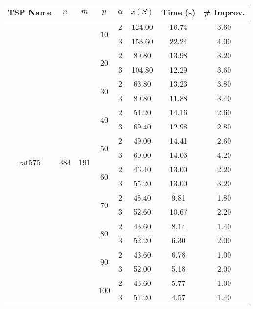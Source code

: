 \begin{tabular}{|ccccc|ccc|}
\toprule
       TSP Name & $n$ & $m$ & $p$ & $\alpha$   & $x(S)$ &  Time (s) &  \# Improv. \\
\midrule
\multirow{20}{*}{rat575} & \multirow{20}{*}{384} & \multirow{20}{*}{191} & \multirow{2}{*}{10} & 2 & 124.00 & 16.74 &     3.60 \\
       &     &     &     & 3 & 153.60 & 22.24 &     4.00 \\
\cline{4-8}
       &     &     & \multirow{2}{*}{20} & 2 &  80.80 & 13.98 &     3.20 \\
       &     &     &     & 3 & 104.80 & 12.29 &     3.60 \\
\cline{4-8}
       &     &     & \multirow{2}{*}{30} & 2 &  63.80 & 13.23 &     3.80 \\
       &     &     &     & 3 &  80.80 & 11.88 &     3.40 \\
\cline{4-8}
       &     &     & \multirow{2}{*}{40} & 2 &  54.20 & 14.16 &     2.60 \\
       &     &     &     & 3 &  69.40 & 12.98 &     2.80 \\
\cline{4-8}
       &     &     & \multirow{2}{*}{50} & 2 &  49.00 & 14.41 &     2.60 \\
       &     &     &     & 3 &  60.00 & 14.03 &     4.20 \\
\cline{4-8}
       &     &     & \multirow{2}{*}{60} & 2 &  46.40 & 13.00 &     2.20 \\
       &     &     &     & 3 &  55.20 & 13.00 &     3.20 \\
\cline{4-8}
       &     &     & \multirow{2}{*}{70} & 2 &  45.40 &  9.81 &     1.80 \\
       &     &     &     & 3 &  52.60 & 10.67 &     2.20 \\
\cline{4-8}
       &     &     & \multirow{2}{*}{80} & 2 &  43.60 &  8.14 &     1.40 \\
       &     &     &     & 3 &  52.20 &  6.30 &     2.00 \\
\cline{4-8}
       &     &     & \multirow{2}{*}{90} & 2 &  43.60 &  6.78 &     1.00 \\
       &     &     &     & 3 &  52.00 &  5.18 &     2.00 \\
\cline{4-8}
       &     &     & \multirow{2}{*}{100} & 2 &  43.60 &  5.77 &     1.00 \\
       &     &     &     & 3 &  51.20 &  4.57 &     1.40 \\
\bottomrule
\end{tabular}
